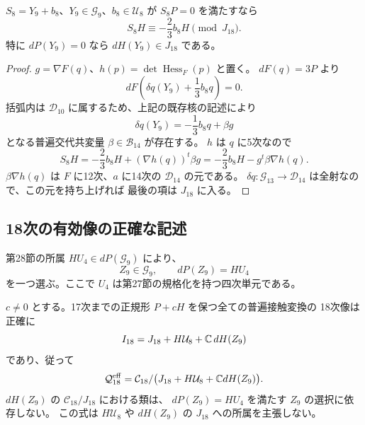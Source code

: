 \begin{lemma}[九次安定化場の作用]
\label{lem:v14-ninth-stabilizer-hessian}
$S_8=Y_9+b_8$、$Y_9\in\mathcal G_9$、$b_8\in\mathcal U_8$ が
$S_8P=0$ を満たすなら
\[
 S_8H\equiv-\frac23b_8H\pmod{J_{18}}.
\]
特に $dP(Y_9)=0$ なら $dH(Y_9)\in J_{18}$ である。
\end{lemma}

\begin{proof}
$g=\nabla F(q)$、$h(p)=\det\operatorname{Hess}_F(p)$ と置く。
$dF(q)=3P$ より
\[
 dF\left(\delta q(Y_9)+\frac13b_8q\right)=0.
\]
括弧内は $\mathcal D_{10}$ に属するため、上記の既存核の記述により
\[
 \delta q(Y_9)=-\frac13b_8q+\beta g
\]
となる普遍交代共変量 $\beta\in\mathcal B_{14}$ が存在する。
$h$ は $q$ に5次なので
\[
 S_8H=-\frac23b_8H+(\nabla h(q))^t\beta g
     =-\frac23b_8H-g^t\beta\nabla h(q).
\]
$\beta\nabla h(q)$ は $F$ に12次、$a$ に14次の $\mathcal D_{14}$ の元である。
$\delta q:\mathcal G_{13}\to\mathcal D_{14}$ は全射なので、この元を持ち上げれば
最後の項は $J_{18}$ に入る。
\end{proof}

\subsection{18次の有効像の正確な記述}

第28節の所属 $HU_4\in dP(\mathcal G_9)$ により、
\[
 Z_9\in\mathcal G_9,\qquad dP(Z_9)=HU_4
\]
を一つ選ぶ。ここで $U_4$ は第27節の規格化を持つ四次単元である。

\begin{theorem}[18次有効商の有限な縮約]
\label{thm:v14-effective-eighteenth}
$c\ne0$ とする。17次までの正規形 $P+cH$ を保つ全ての普遍接触変換の
18次像は正確に
\begin{equation}\label{eq:v14-effective-image}
 I_{18}=J_{18}+H\mathcal U_8+\mathbb C\,dH(Z_9)
\end{equation}
であり、従って
\[
 \mathcal Q^{\mathrm{eff}}_{18}
 =\mathcal C_{18}/\bigl(J_{18}+H\mathcal U_8+\mathbb C dH(Z_9)\bigr).
\]
$dH(Z_9)$ の $\mathcal C_{18}/J_{18}$ における類は、
$dP(Z_9)=HU_4$ を満たす $Z_9$ の選択に依存しない。
この式は $H\mathcal U_8$ や $dH(Z_9)$ の $J_{18}$ への所属を主張しない。
\end{theorem}

